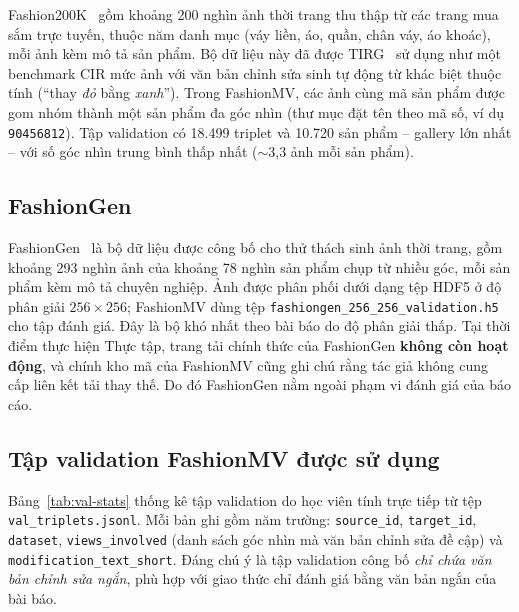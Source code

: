 Fashion200K~\cite{han2017fashion200k} gồm khoảng 200 nghìn ảnh thời trang thu thập từ các trang mua sắm trực tuyến, thuộc năm danh mục (váy liền, áo, quần, chân váy, áo khoác), mỗi ảnh kèm mô tả sản phẩm. Bộ dữ liệu này đã được TIRG~\cite{vo2019tirg} sử dụng như một benchmark CIR mức ảnh với văn bản chỉnh sửa sinh tự động từ khác biệt thuộc tính (``thay \emph{đỏ} bằng \emph{xanh}''). Trong FashionMV, các ảnh cùng mã sản phẩm được gom nhóm thành một sản phẩm đa góc nhìn (thư mục đặt tên theo mã số, ví dụ \texttt{90456812}). Tập validation có 18.499 triplet và 10.720 sản phẩm -- gallery lớn nhất -- với số góc nhìn trung bình thấp nhất ($\sim$3,3 ảnh mỗi sản phẩm).

\subsection{FashionGen}

FashionGen~\cite{rostamzadeh2018fashiongen} là bộ dữ liệu được công bố cho thử thách sinh ảnh thời trang, gồm khoảng 293 nghìn ảnh của khoảng 78 nghìn sản phẩm chụp từ nhiều góc, mỗi sản phẩm kèm mô tả chuyên nghiệp. Ảnh được phân phối dưới dạng tệp HDF5 ở độ phân giải $256 \times 256$; FashionMV dùng tệp \texttt{fashiongen\_256\_256\_validation.h5} cho tập đánh giá. Đây là bộ khó nhất theo bài báo do độ phân giải thấp. Tại thời điểm thực hiện Thực tập, trang tải chính thức của FashionGen \textbf{không còn hoạt động}, và chính kho mã của FashionMV cũng ghi chú rằng tác giả không cung cấp liên kết tải thay thế. Do đó FashionGen nằm ngoài phạm vi đánh giá của báo cáo.

\subsection{Tập validation FashionMV được sử dụng}

Bảng~\ref{tab:val-stats} thống kê tập validation do học viên tính trực tiếp từ tệp \texttt{val\_triplets.jsonl}. Mỗi bản ghi gồm năm trường: \texttt{source\_id}, \texttt{target\_id}, \texttt{dataset}, \texttt{views\_involved} (danh sách góc nhìn mà văn bản chỉnh sửa đề cập) và \texttt{modification\_text\_short}. Đáng chú ý là tập validation công bố \emph{chỉ chứa văn bản chỉnh sửa ngắn}, phù hợp với giao thức chỉ đánh giá bằng văn bản ngắn của bài báo.

